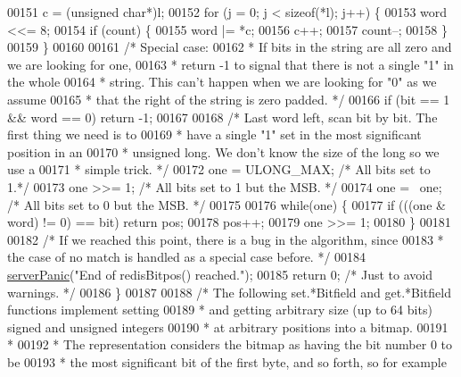 \begin{DoxyCode}
00151     c = (\textcolor{keywordtype}{unsigned} \textcolor{keywordtype}{char}*)l;
00152     \textcolor{keywordflow}{for} (j = 0; j < \textcolor{keyword}{sizeof}(*l); j++) \{
00153         word <<= 8;
00154         \textcolor{keywordflow}{if} (count) \{
00155             word |= *c;
00156             c++;
00157             count--;
00158         \}
00159     \}
00160 
00161     \textcolor{comment}{/* Special case:}
00162 \textcolor{comment}{     * If bits in the string are all zero and we are looking for one,}
00163 \textcolor{comment}{     * return -1 to signal that there is not a single "1" in the whole}
00164 \textcolor{comment}{     * string. This can't happen when we are looking for "0" as we assume}
00165 \textcolor{comment}{     * that the right of the string is zero padded. */}
00166     \textcolor{keywordflow}{if} (bit == 1 && word == 0) \textcolor{keywordflow}{return} -1;
00167 
00168     \textcolor{comment}{/* Last word left, scan bit by bit. The first thing we need is to}
00169 \textcolor{comment}{     * have a single "1" set in the most significant position in an}
00170 \textcolor{comment}{     * unsigned long. We don't know the size of the long so we use a}
00171 \textcolor{comment}{     * simple trick. */}
00172     one = ULONG\_MAX; \textcolor{comment}{/* All bits set to 1.*/}
00173     one >>= 1;       \textcolor{comment}{/* All bits set to 1 but the MSB. */}
00174     one = ~one;      \textcolor{comment}{/* All bits set to 0 but the MSB. */}
00175 
00176     \textcolor{keywordflow}{while}(one) \{
00177         \textcolor{keywordflow}{if} (((one & word) != 0) == bit) \textcolor{keywordflow}{return} pos;
00178         pos++;
00179         one >>= 1;
00180     \}
00181 
00182     \textcolor{comment}{/* If we reached this point, there is a bug in the algorithm, since}
00183 \textcolor{comment}{     * the case of no match is handled as a special case before. */}
00184     \hyperlink{server_8h_a11cc378e7778a830b41240578de3b204}{serverPanic}(\textcolor{stringliteral}{"End of redisBitpos() reached."});
00185     \textcolor{keywordflow}{return} 0; \textcolor{comment}{/* Just to avoid warnings. */}
00186 \}
00187 
00188 \textcolor{comment}{/* The following set.*Bitfield and get.*Bitfield functions implement setting}
00189 \textcolor{comment}{ * and getting arbitrary size (up to 64 bits) signed and unsigned integers}
00190 \textcolor{comment}{ * at arbitrary positions into a bitmap.}
00191 \textcolor{comment}{ *}
00192 \textcolor{comment}{ * The representation considers the bitmap as having the bit number 0 to be}
00193 \textcolor{comment}{ * the most significant bit of the first byte, and so forth, so for example}

\end{DoxyCode}
